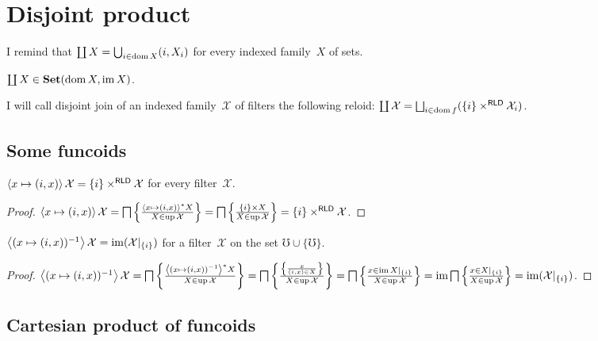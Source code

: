 \chapter{Disjoint product}

I remind that
$\coprod X = \bigcup_{i\in\operatorname{dom} X} (i,X_i)$
for every indexed family~$X$ of sets.

\begin{obvious}
$\coprod X\in\mathbf{Set}(\operatorname{dom} X,\operatorname{im} X)$.
\end{obvious}

\begin{defn}
I will call disjoint join of an indexed family~$\mathcal{X}$ of filters the following reloid: $\coprod\mathcal{X} = \bigsqcup_{i\in\dom f}(\{i\}\times^{\mathsf{RLD}}\mathcal{X}_i)$.
\end{defn}

\section{Some funcoids}

\begin{prop}
$\left\langle x\mapsto(i,x)\right\rangle\mathcal{X}=\{i\}\times^{\mathsf{RLD}}\mathcal{X}$ for every filter~$\mathcal{X}$.
\end{prop}

\begin{proof}
$\left\langle x\mapsto(i,x)\right\rangle\mathcal{X}=\bigsqcap\left\{ \frac{\left\langle x\mapsto(i,x)\right\rangle ^{\ast}X}{X\in\operatorname{up}\mathcal{X}}\right\}=\bigsqcap\left\{ \frac{\{i\}\times X}{X\in\operatorname{up}\mathcal{X}}\right\}=\{i\}\times^{\mathsf{RLD}}\mathcal{X}$.
\end{proof}

\begin{prop}
$\left\langle (x\mapsto(i,x))^{-1}\right\rangle\mathcal{X}=\operatorname{im}(\mathcal{X}|_{\{i\}})$ for a filter~$\mathcal{X}$ on the set $\mho\cup\{{\mho}\}$.
\end{prop}

\begin{proof}
$\left\langle (x\mapsto(i,x))^{-1}\right\rangle\mathcal{X}=\bigsqcap\left\{ \frac{\left\langle (x\mapsto(i,x))^{-1}\right\rangle ^{\ast}X}{X\in\operatorname{up}\mathcal{X}}\right\}=\bigsqcap\left\{ \frac{\left\{ \frac{x}{(i,x)\in X}\right\}}{X\in\operatorname{up}\mathcal{X}}\right\}=\bigsqcap\left\{ \frac{x\in\operatorname{im} X|_{\{i\}}}{X\in\operatorname{up}\mathcal{X}}\right\}=\operatorname{im}\bigsqcap\left\{ \frac{x\in X|_{\{i\}}}{X\in\operatorname{up}\mathcal{X}}\right\}=\operatorname{im}(\mathcal{X}|_{\{i\}})$.
\end{proof}

\section{Cartesian product of funcoids}

